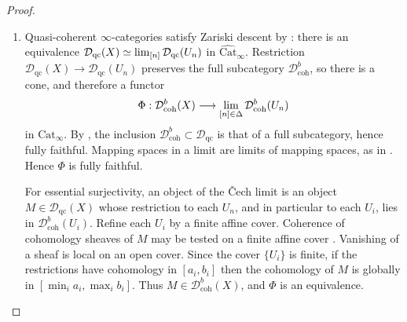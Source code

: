 \documentclass[11pt]{amsart}
\renewcommand{\lim}{\operatornamewithlimits{\rm{lim}}}
\newcommand{\Cat}{\mathrm{Cat}}
\newcommand{\Catbig}{\widehat{\mathrm{Cat}}}
\newcommand{\Dqc}{\mathcal D_{\mathrm{qc}}}
\newcommand{\Dbc}{\mathcal D^b_{\mathrm{coh}}}
\theoremstyle{plain}
\theoremstyle{definition}
\numberwithin{equation}{section}
\begin{document}
\begin{proof}
\begin{enumerate}
\item
Quasi-coherent $\infty$-categories satisfy Zariski descent by : there is an equivalence $\Dqc(X)\simeq\lim_{[n]}\Dqc(U_n)$ in $\Catbig_\infty$.
Restriction $\Dqc(X)\to\Dqc(U_n)$ preserves the full subcategory $\Dbc$, so there is a cone, and therefore a functor
\[
 \Phi:\Dbc(X)\longrightarrow\lim_{[n]\in\Delta}\Dbc(U_n)
\]
in $\Cat_\infty$.
By , the inclusion $\Dbc\subset\Dqc$ is that of a full subcategory, hence fully faithful.
Mapping spaces in a limit are limits of mapping spaces, as in .
Hence $\Phi$ is fully faithful.

For essential surjectivity, an object of the \v Cech limit is an object $M\in\Dqc(X)$ whose restriction to each $U_n$, and in particular to each $U_i$, lies in $\Dbc(U_i)$.
Refine each $U_i$ by a finite affine cover.
Coherence of cohomology sheaves of $M$ may be tested on a finite affine cover \cite[\href{https://stacks.math.columbia.edu/tag/01XZ}{Tag 01XZ}]{SP}.
Vanishing of a sheaf is local on an open cover.
Since the cover $\{U_i\}$ is finite, if the restrictions have cohomology in $[a_i,b_i]$ then the cohomology of $M$ is globally in $[\min_i a_i,\max_i b_i]$.
Thus $M\in\Dbc(X)$, and $\Phi$ is an equivalence.


\end{enumerate}
\end{proof}
\end{document}
